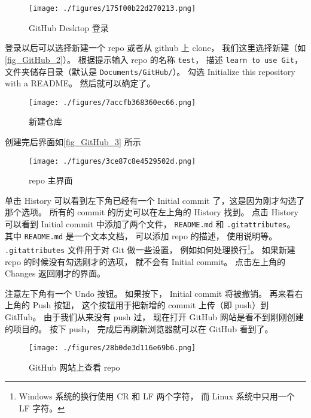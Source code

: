 \begin{figure}[ht]
\centering
\texttt{[image: ./figures/175f00b22d270213.png]}
\caption{GitHub Desktop 登录} \label{fig_GitHub_1}
\end{figure}

登录以后可以选择新建一个 repo 或者从 github 上 clone， 我们这里选择新建（如\autoref{fig_GitHub_2}）。 根据提示输入 repo 的名称 \verb|test|， 描述 \verb|learn to use Git|， 文件夹储存目录（默认是 \verb|Documents/GitHub/|）。 勾选 Initialize this repository with a README。 然后就可以确定了。

\begin{figure}[ht]
\centering
\texttt{[image: ./figures/7accfb368360ec66.png]}
\caption{新建仓库} \label{fig_GitHub_2}
\end{figure}

创建完后界面如\autoref{fig_GitHub_3} 所示
\begin{figure}[ht]
\centering
\texttt{[image: ./figures/3ce87c8e4529502d.png]}
\caption{repo 主界面} \label{fig_GitHub_3}
\end{figure}

单击 History 可以看到左下角已经有一个 Initial commit 了，这是因为刚才勾选了那个选项。 所有的 commit 的历史可以在左上角的 History 找到。 点击 History 可以看到 Initial commit 中添加了两个文件， \verb|README.md| 和 \verb|.gitattributes|。 其中 \verb|README.md| 是一个文本文档， 可以添加 repo 的描述， 使用说明等。 \verb|.gitattributes| 文件用于对 Git 做一些设置， 例如如何处理换行\footnote{Windows 系统的换行使用 CR 和 LF 两个字符， 而 Linux 系统中只用一个 LF 字符。}。 如果新建 repo 的时候没有勾选刚才的选项， 就不会有 Initial commit。 点击左上角的 Changes 返回刚才的界面。

注意左下角有一个 Undo 按钮。 如果按下， Initial commit 将被撤销。 再来看右上角的 Push 按钮， 这个按钮用于把新增的 commit 上传（即 push）到 GitHub。 由于我们从来没有 push 过， 现在打开 GitHub 网站是看不到刚刚创建的项目的。 按下 push， 完成后再刷新浏览器就可以在 GitHub 看到了。
\begin{figure}[ht]
\centering
\texttt{[image: ./figures/28b0de3d116e69b6.png]}
\caption{GitHub 网站上查看 repo} \label{fig_GitHub_5}
\end{figure}
